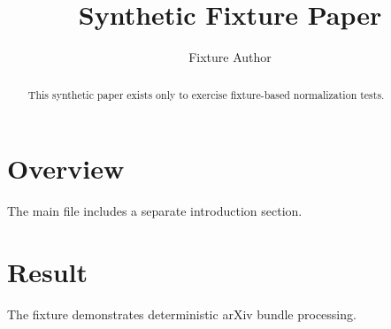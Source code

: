 \documentclass{article}
\title{Synthetic Fixture Paper}
\author{Fixture Author}
\begin{document}
\maketitle
\begin{abstract}
This synthetic paper exists only to exercise fixture-based normalization tests.
\end{abstract}
\section{Overview}
The main file includes a separate introduction section.

\section{Result}
The fixture demonstrates deterministic arXiv bundle processing.
\end{document}
